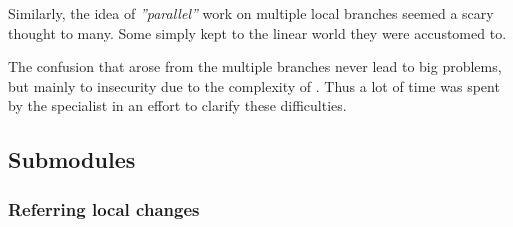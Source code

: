 Similarly, the idea of \textit{''parallel''} work on multiple local branches seemed a scary thought to many.
Some simply kept to the linear world they were accustomed to.

The confusion that arose from the multiple branches never lead to big problems, but mainly to insecurity due to the complexity of \git{}.
Thus a lot of time was spent by the \git{} specialist in an effort to clarify these difficulties.

\subsection{Submodules}
\subsubsection{Referring local changes}
